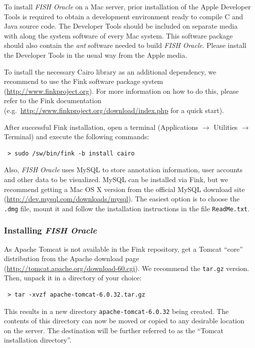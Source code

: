 \documentclass[11pt,final]{article}
\newcommand{\FO}[0]{\emph{FISH Oracle}\xspace}
\begin{document}
To install \FO on a Mac server, prior installation of the Apple Developer
Tools is required to obtain a development environment ready to compile C and
Java source code. The Developer Tools should be included on separate media with
along the system software of every Mac system. This software package should
also contain the \emph{ant} software needed to build \FO. Please install the
Developer Tools in the usual way from the Apple media.

To install the necessary Cairo library as an additional dependency,
we recommend to use the Fink software package system
(\url{http://www.finkproject.org}).
For more information on how to do this, please refer to the Fink documentation
(e.g.\ \url{http://www.finkproject.org/download/index.php} for a quick start).

After successful Fink installation, open a terminal
(Applications $\rightarrow$ Utilities $\rightarrow$ Terminal)
and execute the following commands:

\begin{lstlisting}
 > sudo /sw/bin/fink -b install cairo
\end{lstlisting}

Also, \FO uses MySQL to store annotation information, user accounts and
other data to be visualized. MySQL can be installed via Fink, but we recommend
getting a Mac OS X version from the official MySQL download site
(\url{http://dev.mysql.com/downloads/mysql}). The easiest option is to choose
the \texttt{.dmg} file, mount it and follow the installation instructions in
the file \texttt{ReadMe.txt}.


\subsubsection*{Installing \FO}

As Apache Tomcat is not available in the Fink repository, get a Tomcat
``core'' distribution from the Apache download page
(\url{http://tomcat.apache.org/download-60.cgi}). We recommend the
\texttt{tar.gz} version. Then, unpack it in a directory of your choice:

\begin{lstlisting}
 > tar -xvzf apache-tomcat-6.0.32.tar.gz
\end{lstlisting}

This results in a new directory \texttt{apache-tomcat-6.0.32} being created.
The contents of this directory can now be moved or copied to any desirable
location on the server. The destination will be further referred to as the
``Tomcat installation directory''.
\end{document}
